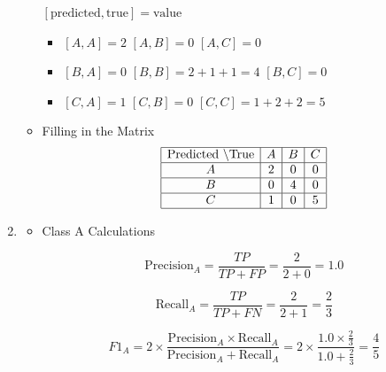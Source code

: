 \documentclass[12pt]{article}
\begin{document}
\begin{enumerate}[leftmargin=\labelsep, label=\textbf{\arabic*.)}]
\begin{itemize}
                    $[\text{predicted}, \text{true}] = \text{value}$
                    \begin{itemize}
                        \item $[A, A] = 2$ \hspace{1cm} $[A, B] = 0$ \hspace{1cm} $[A, C] = 0$
                        \item $[B, A] = 0$ \hspace{1cm} $[B, B] = 2 + 1 + 1 = 4$ \hspace{1cm} $[B, C] = 0$
                        \item $[C, A] = 1$ \hspace{1cm} $[C, B] = 0$ \hspace{1cm} $[C, C] = 1 + 2 + 2 = 5$
                    \end{itemize}
              \item Filling in the Matrix
                    \[
                        \begin{array}{|c|c|c|c|}
                            \hline
                            \text{Predicted \textbackslash True} & A & B & C \\
                            \hline
                            A                                    & 2 & 0 & 0 \\
                            \hline
                            B                                    & 0 & 4 & 0 \\
                            \hline
                            C                                    & 1 & 0 & 5 \\
                            \hline
                        \end{array}
                    \]
          \end{itemize}
    \item \begin{itemize}
              \item Class A Calculations

                    \[
                        \text{Precision}_A = \frac{TP}{TP + FP} = \frac{2}{2 + 0} = 1.0
                    \]

                    \[
                        \text{Recall}_A = \frac{TP}{TP + FN} = \frac{2}{2 + 1} = \frac{2}{3}
                    \]

                    \[
                        F1_A = 2 \times \frac{\text{Precision}_A \times \text{Recall}_A}{\text{Precision}_A + \text{Recall}_A} = 2 \times \frac{1.0 \times \frac{2}{3}}{1.0 + \frac{2}{3}} = \frac{4}{5}
                    \]


\end{itemize}
\end{enumerate}
\end{document}
